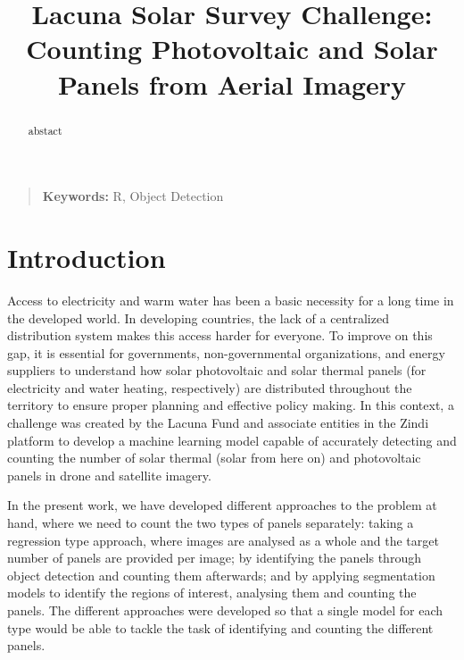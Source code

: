 \documentclass[conference]{IEEEtran}
\begin{document}
\title{Lacuna Solar Survey Challenge: Counting Photovoltaic and Solar Panels from Aerial Imagery}

\author{
\and
{}
}

\maketitle
\thispagestyle{plain}

\begin{abstract}
abstact
\end{abstract}

\begin{quote}
\small
\noindent
\textbf{Keywords:} R, Object Detection
\end{quote}

\IEEEpeerreviewmaketitle


\section{Introduction}

Access to electricity and warm water has been a basic necessity for a long time in the developed world. In developing countries, the lack of a centralized distribution system makes this access harder for everyone. To improve on this gap, it is essential for governments, non-governmental organizations, and energy suppliers to understand how solar photovoltaic and solar thermal panels (for electricity and water heating, respectively) are distributed throughout the territory to ensure proper planning and effective policy making. In this context, a challenge was created by the Lacuna Fund and associate entities in the Zindi platform to develop a machine learning model capable of accurately detecting and counting the number of solar thermal (solar from here on) and photovoltaic panels in drone and satellite imagery.

In the present work, we have developed different approaches to the problem at hand, where we need to count the two types of panels separately: taking a regression type approach, where images are analysed as a whole and the target number of panels are provided per image; by identifying the panels through object detection and counting them afterwards; and by applying segmentation models to identify the regions of interest, analysing them and counting the panels. The different approaches were developed so that a single model for each type would be able to tackle the task of identifying and counting the different panels.
\end{document}

